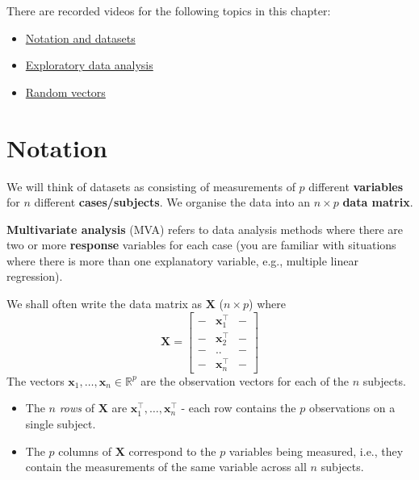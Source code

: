 \documentclass[]{book}
\providecommand{\tightlist}{%
  \setlength{\itemsep}{0pt}\setlength{\parskip}{0pt}}
\theoremstyle{definition}
\theoremstyle{definition}
\theoremstyle{definition}
\theoremstyle{remark}
\begin{document}
There are recorded videos for the following topics in this chapter:

\begin{itemize}
\tightlist
\item
  \href{https://mediaspace.nottingham.ac.uk/media/Notation+and+Datasets/1_p2nas9i4}{Notation and datasets}
\item
  \href{https://mediaspace.nottingham.ac.uk/media/Exploratory+data+analysis/1_seh9o28a}{Exploratory data analysis}
\item
  \href{https://mediaspace.nottingham.ac.uk/media/Random+Vectors/1_fpq4r9wh}{Random vectors}
\end{itemize}

\hypertarget{notation}{%
\section{Notation}\label{notation}}

We will think of datasets as consisting of measurements of \(p\) different \textbf{variables} for \(n\) different \textbf{cases/subjects}. We organise the data into an \(n \times p\) \textbf{data matrix}.

\textbf{Multivariate analysis} (MVA) refers to data analysis methods where there are two or more \textbf{response} variables for each case (you are familiar with situations where there is more than one explanatory variable, e.g., multiple linear regression).

We shall often write the data matrix as \(\mathbf X\) (\(n \times p\)) where
\[
{\mathbf X}=\left[ \begin{array}{ccc}
- &\mathbf x_1^\top&-\\
- &\mathbf x_2^\top&-\\
- &..&-\\
- &\mathbf x_n^\top&-
\end{array}\right ]
\]
The vectors \(\mathbf x_1, \ldots , \mathbf x_n \in \mathbb{R}^p\) are the observation vectors for each of the \(n\) subjects.

\begin{itemize}
\tightlist
\item
  The \(n\) \emph{rows} of \(\mathbf X\) are \(\mathbf x_1^\top, \ldots , \mathbf x_n^\top\) - each row contains the \(p\) observations on a single subject.
\item
  The \(p\) columns of \(\mathbf X\) correspond to the \(p\) variables being measured, i.e., they contain the measurements of the same variable across all \(n\) subjects.
\end{itemize}
\end{document}
